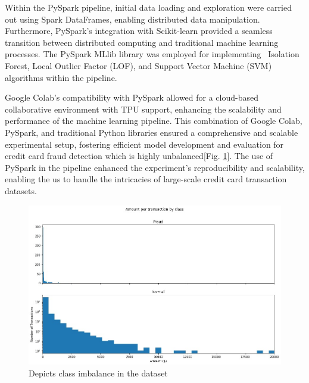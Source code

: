 \documentclass[journal]{IEEEtran}
\begin{document}
Within the PySpark pipeline, initial data loading and exploration were carried out using Spark DataFrames, enabling distributed data manipulation. Furthermore, PySpark's integration with Scikit-learn provided a seamless transition between distributed computing and traditional machine learning processes. The PySpark MLlib library was employed for implementing ~Isolation Forest, Local Outlier Factor (LOF)\cite{LOF}, and Support Vector Machine (SVM) algorithms within the pipeline.

Google Colab's compatibility with PySpark allowed for a cloud-based collaborative environment with TPU support, enhancing the scalability and performance of the machine learning pipeline. This combination of Google Colab, PySpark, and traditional Python libraries ensured a comprehensive and scalable experimental setup, fostering efficient model development and evaluation for credit card fraud detection which is highly unbalanced[Fig. \ref{fig:class imb}]. The use of PySpark in the pipeline enhanced the experiment's reproducibility and scalability, enabling the us to handle the intricacies of large-scale credit card transaction datasets.
\begin{figure}[h]
    \centering
    \includegraphics[width=1\linewidth]{Class_imbalance.jpg}
    \caption{Depicts class imbalance in the dataset}
    \label{fig:class imb}
\end{figure}

\end{document}

